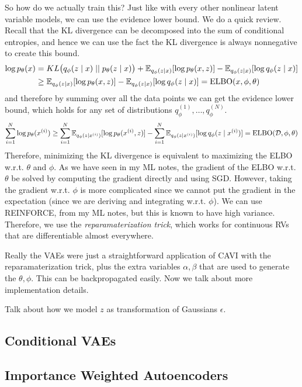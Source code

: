   So how do we actually train this? Just like with every other nonlinear latent variable models, we can use the evidence lower bound. We do a quick review. Recall that the KL divergence can be decomposed into the sum of conditional entropies, and hence we can use the fact the KL divergence is always nonnegative to create this bound. 
  \begin{align}
    \log p_\theta (x) & = KL \big( q_\phi (z \mid x) \mid\mid p_{\theta} (z \mid x) \big) + \mathbb{E}_{q_{\phi} (z \mid x)} [\log p_{\theta} (x, z)] - \mathbb{E}_{q_\phi(z \mid x)} [ \log q_{\phi} (z \mid x)] \\
                      & \geq \mathbb{E}_{q_{\phi} (z \mid x)} [\log p_{\theta} (x, z)] - \mathbb{E}_{q_\phi(z \mid x)} [ \log q_{\phi} (z \mid x)] = \operatorname{ELBO}(x, \phi, \theta)
  \end{align}
  and therefore by summing over all the data points we can get the evidence lower bound, which holds for any set of distributions $q_\phi^{(1)}, \ldots, q_\phi^{(N)}$.  
  \begin{equation}
    \sum_{i=1}^N \log p_{\theta} (x^{(i)}) \geq \sum_{i=1}^N \mathbb{E}_{q_\phi (z \mid x^{(i)})} [ \log p_{\theta} (x^{(i)}, z)] - \sum_{i=1}^N \mathbb{E}_{q_{\phi} (z \mid x^{(i)})} [ \log q_{\phi} (z \mid x^{(i)}) ] = \operatorname{ELBO}(\mathcal{D}, \phi, \theta)
  \end{equation}
  Therefore, minimizing the KL divergence is equivalent to maximizing the ELBO w.r.t. $\theta$ and $\phi$. As we have seen in my ML notes, the gradient of the ELBO w.r.t. $\theta$ be solved by computing the gradient directly and using SGD. However, taking the gradient w.r.t. $\phi$ is more complicated since we cannot put the gradient in the expectation (since we are deriving and integrating w.r.t. $\phi$). We can use REINFORCE, from my ML notes, but this is known to have high variance. Therefore, we use the \textit{reparamaterization trick}, which works for continuous RVs that are differentiable almost everywhere. 

  Really the VAEs were just a straightforward application of CAVI with the reparamaterization trick, plus the extra variables $\alpha, \beta$ that are used to generate the $\theta, \phi$. This can be backpropagated easily. Now we talk about more implementation details. 

  Talk about how we model $z$ as transformation of Gaussians $\epsilon$. 

\subsection{Conditional VAEs}

\subsection{Importance Weighted Autoencoders}


